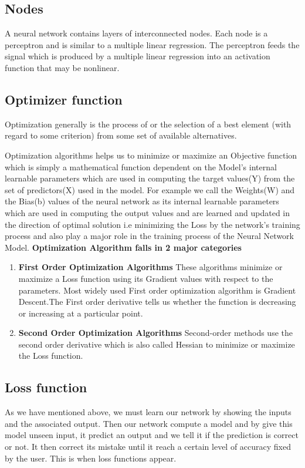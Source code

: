 \subsection{Nodes}
\par A neural network contains layers of interconnected nodes. Each node is a perceptron and is similar to a multiple linear regression. The perceptron feeds the signal which is produced by a multiple linear regression into an activation function that may be nonlinear.

\subsection{Optimizer function}
Optimization generally is the process of or the selection of a best element (with regard to some criterion) from some set of available alternatives.

\par Optimization algorithms helps us to minimize or maximize an Objective function which is simply a mathematical function dependent on the Model’s internal learnable parameters which are used in computing the target values(Y) from the set of predictors(X) used in the model. For example we call the Weights(W) and the Bias(b) values of the neural network as its internal learnable parameters which are used in computing the output values and are learned and updated in the direction of optimal solution i.e minimizing the Loss by the network’s training process and also play a major role in the training process of the Neural Network Model. \newline 
\textbf{Optimization Algorithm falls in 2 major categories}
\begin{enumerate}
    \item \textbf{First Order Optimization Algorithms} \newline
            These algorithms minimize or maximize a Loss function using its Gradient values with respect to the parameters. Most widely used First order optimization algorithm is Gradient Descent.The First order derivative tells us whether the function is decreasing or increasing at a particular point. 
    \item \textbf{Second Order Optimization Algorithms} \newline
            Second-order methods use the second order derivative which is also called Hessian to minimize or maximize the Loss function.
\end{enumerate}
\subsection{Loss function}
As we have mentioned above, we must learn our network by showing the inputs and the associated output.  Then our network  compute  a  model  and  by  give  this  model  unseen  input,  it  predict  an  output  and  we  tell  it  if  the prediction is correct or not.  It then correct its mistake until it reach a certain level of accuracy fixed by the user.  This is when loss functions appear.
